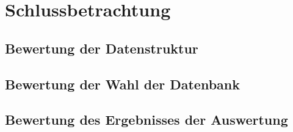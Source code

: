 \section{Schlussbetrachtung}

\subsection{Bewertung der Datenstruktur}

\subsection{Bewertung der Wahl der Datenbank}

\subsection{Bewertung des Ergebnisses der Auswertung}

\clearpage